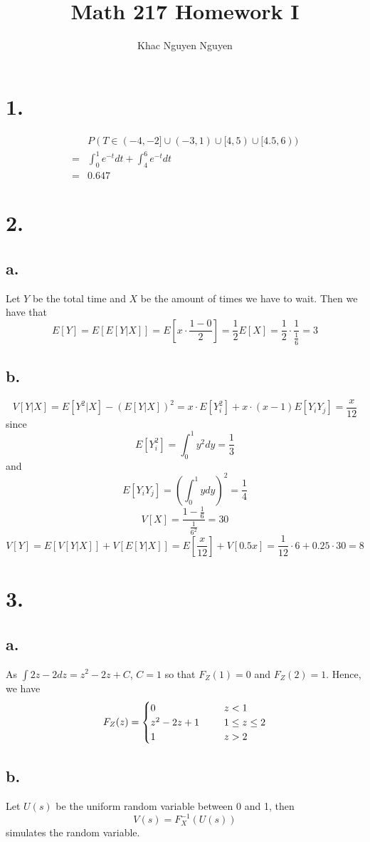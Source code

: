 \documentclass[11pt]{article}
\title{\textbf{Math 217 Homework I}}
\author{Khac Nguyen Nguyen}
\date{}
\begin{document}
\section*{1.}
\begin{equation*}
    \begin{aligned}
        &P(T \in (-4,-2] \cup (-3,1) \cup [4,5) \cup [4.5,6)) \\
        =&\int_0^1  e^{-t} dt +\int_4^6 e^{-t} dt \\
        =& 0.647
    \end{aligned}
\end{equation*}
\pagebreak
\section*{2.}
\subsection*{a.}
Let $Y$ be the total time and $X$ be the amount of times we have to wait. Then we have that
\[
    E[Y] = E[E[Y|X]] = E\left[x \cdot \frac{1-0}{2}\right] = \frac{1}{2} E[X] 
    = \frac{1}{2} \cdot \frac{1}{\frac{1}{6}} = 3
\]
\subsection*{b.}
\[
    V[Y|X] = E[Y^2|X] - (E[Y|X])^2 = x \cdot E[Y_i^2] + x \cdot (x-1) E[Y_iY_j] = \frac{x}{12}
\]
since 
\[
    E[Y_i^2] = \int_0^1 y^2 dy = \frac{1}{3}    
\]
and 
\[
    E[Y_iY_j] = \left(\int_0^1 ydy\right)^2 = \frac{1}{4}    
\]
\[
    V[X] = \frac{1-\frac{1}{6}}{\frac{1}{6^2}} = 30 
\]
\[
    V[Y] = E[V[Y|X]] + V[E[Y|X]] = E[\frac{x}{12}] + V[0.5x] = \frac{1}{12} \cdot 6 + 0.25 \cdot 30 = 8    
\]
\pagebreak
\section*{3.}
\subsection*{a.}
As $\int 2z-2 dz = z^2 - 2z + C$, $C = 1$ so that $F_Z(1) = 0$ and $F_Z(2) = 1$. Hence,  we have
\[
    F_Z(z) = 
    \begin{cases}
        0 \indent & z<1 \\
        z^2-2z+1 \indent &1 \le z \le 2 \\
        1 \indent &z>2
    \end{cases}    
\]
\subsection*{b.}
Let $U(s)$ be the uniform random variable between 0 and 1, then 
\[
    V(s) = F^{-1}_X(U(s))    
\]
simulates the random variable.
\pagebreak
\end{document}
